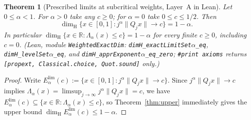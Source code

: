 \documentclass[11pt]{article}
\newtheorem{theorem}{Theorem}
\theoremstyle{definition}
\theoremstyle{remark}
\newcommand{\R}{\mathbb{R}}
\newcommand{\dimH}{\dim_{\mathrm{H}}}
\newcommand{\Lam}{\Lambda}
\begin{document}
\begin{theorem}[Prescribed limits at subcritical weights, Layer~A in Lean]\label{conj:weight}
Let $0\le\alpha<1$. For $\alpha>0$ take any $c\ge0$; for $\alpha=0$
take $0\le c\le1/2$. Then
\[
 \dimH\{x\in[0,1]: j^\alpha\|Q_jx\|\longrightarrow c\}=1-\alpha .
\]
In particular $\dimH\{x\in\R:\Lam_\alpha(x)\le c\}=1-\alpha$ for every
finite $c\ge0$, including $c=0$.
(Lean, module \texttt{WeightedExactDim}:
\texttt{dimH\_\allowbreak exactLimitSet\ensuremath{\alpha}\_eq},
\texttt{dimH\_\allowbreak levelSet\ensuremath{\alpha}\_eq}, and
\texttt{dimH\_\allowbreak apprExponent\ensuremath{\alpha}\_eq\_\allowbreak zero};
\texttt{\#print axioms} returns \texttt{[propext, Classical.choice, Quot.sound]} only.)
\end{theorem}

\begin{proof}
Write $E_{\alpha}^{\mathrm{lim}}(c):=\{x\in[0,1]:j^\alpha\|Q_jx\|\to c\}$. Since
$j^\alpha\|Q_jx\|\to c$ implies $\Lam_\alpha(x)=\limsup_{j\to\infty}j^\alpha\|Q_jx\|=c$,
we have $E_{\alpha}^{\mathrm{lim}}(c)\subseteq\{x\in\R:\Lam_\alpha(x)\le c\}$, so
Theorem~\ref{thm:upper} immediately gives the upper bound
$\dimH E_{\alpha}^{\mathrm{lim}}(c)\le1-\alpha$.


\end{proof}
\end{document}
